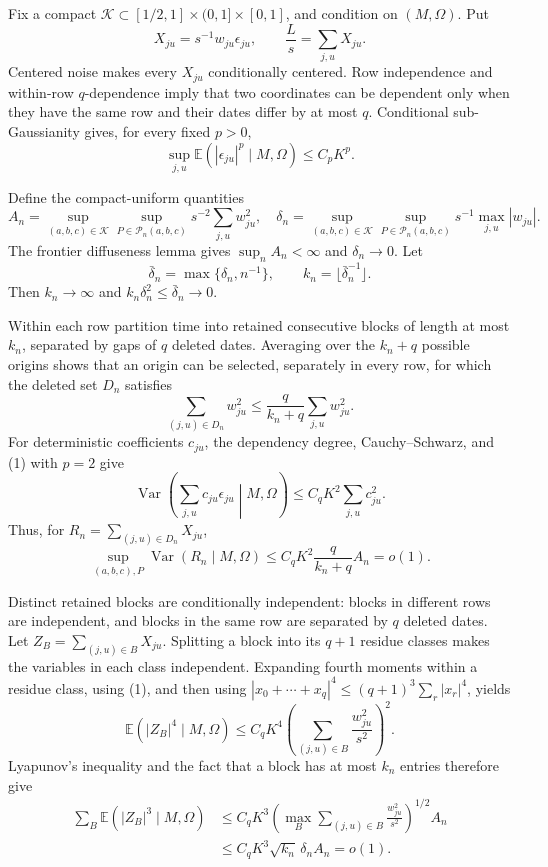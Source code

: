 Fix a compact \(\mathcal K\subset[1/2,1]\times(0,1]\times[0,1]\), and condition on \((M,\Omega)\).  Put
\[
 X_{ju}=s^{-1}w_{ju}\epsilon_{ju},
 \qquad \frac Ls=\sum_{j,u}X_{ju}.
\]
Centered noise makes every \(X_{ju}\) conditionally centered.  Row independence and within-row \(q\)-dependence imply that two coordinates can be dependent only when they have the same row and their dates differ by at most \(q\).  Conditional sub-Gaussianity gives, for every fixed \(p>0\),
\[
 \sup_{j,u}\mathbb E(|\epsilon_{ju}|^p\mid M,\Omega)
 \le C_pK^p.
 \tag{1}
\]

Define the compact-uniform quantities
\[
 A_n=\sup_{(a,b,c)\in\mathcal K}\sup_{P\in\mathcal P_n(a,b,c)}
 s^{-2}\sum_{j,u}w_{ju}^2,
 \quad
 \delta_n=\sup_{(a,b,c)\in\mathcal K}\sup_{P\in\mathcal P_n(a,b,c)}
 s^{-1}\max_{j,u}|w_{ju}|.
\]
The frontier diffuseness lemma gives \(\sup_nA_n<\infty\) and \(\delta_n\to0\).  Let
\[
 \bar\delta_n=\max\{\delta_n,n^{-1}\},
 \qquad k_n=\lfloor\bar\delta_n^{-1}\rfloor.
\]
Then \(k_n\to\infty\) and \(k_n\delta_n^2\le\bar\delta_n\to0\).

Within each row partition time into retained consecutive blocks of length at most \(k_n\), separated by gaps of \(q\) deleted dates.  Averaging over the \(k_n+q\) possible origins shows that an origin can be selected, separately in every row, for which the deleted set \(D_n\) satisfies
\[
 \sum_{(j,u)\in D_n}w_{ju}^2
 \le\frac{q}{k_n+q}\sum_{j,u}w_{ju}^2.
 \tag{2}
\]
For deterministic coefficients \(c_{ju}\), the dependency degree, Cauchy--Schwarz, and (1) with \(p=2\) give
\[
 \operatorname{Var}\!\left(\sum_{j,u}c_{ju}\epsilon_{ju}\middle|M,\Omega\right)
 \le C_qK^2\sum_{j,u}c_{ju}^2.
 \tag{3}
\]
Thus, for \(R_n=\sum_{(j,u)\in D_n}X_{ju}\),
\[
 \sup_{(a,b,c),P}\operatorname{Var}(R_n\mid M,\Omega)
 \le C_qK^2\frac{q}{k_n+q}A_n=o(1).
 \tag{4}
\]

Distinct retained blocks are conditionally independent: blocks in different rows are independent, and blocks in the same row are separated by \(q\) deleted dates.  Let \(Z_B=\sum_{(j,u)\in B}X_{ju}\).  Splitting a block into its \(q+1\) residue classes makes the variables in each class independent.  Expanding fourth moments within a residue class, using (1), and then using \(|x_0+\cdots+x_q|^4\le(q+1)^3\sum_r|x_r|^4\), yields
\[
 \mathbb E(|Z_B|^4\mid M,\Omega)
 \le C_qK^4\left(\sum_{(j,u)\in B}\frac{w_{ju}^2}{s^2}\right)^2.
 \tag{5}
\]
Lyapunov's inequality and the fact that a block has at most \(k_n\) entries therefore give
\[
 \begin{aligned}
 \sum_B\mathbb E(|Z_B|^3\mid M,\Omega)
 &\le C_qK^3
 \left(\max_B\sum_{(j,u)\in B}\frac{w_{ju}^2}{s^2}\right)^{1/2}A_n\\
 &\le C_qK^3\sqrt{k_n}\,\delta_nA_n=o(1).
 \end{aligned}
 \tag{6}
\]

